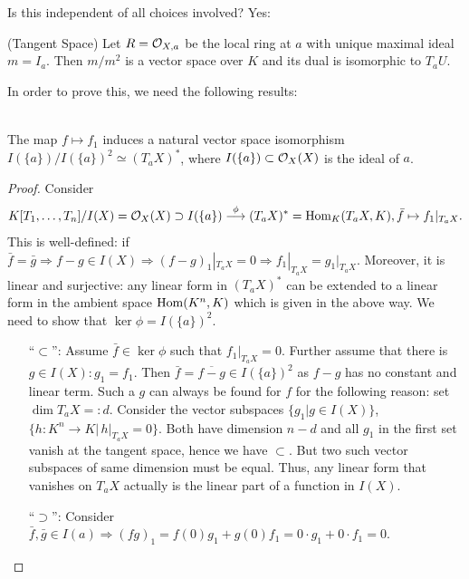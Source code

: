 \documentclass[a4paper,11pt]{article}
\begin{document}
				Is this independent of all choices involved? Yes:
				\\

				\begin{prop}(Tangent Space)\label{prop--tangentspace}
					Let $R=\mathcal{O}_{X,a}$ be the local ring at $a$ with unique maximal ideal $m=I_a$. Then $m/m^2$ is a vector space over $K$ and its dual is isomorphic to $T_aU$.
				\end{prop}

				In order to prove this, we need the following results:

				\begin{thm}\phantom{k}\\
					The map $f\mapsto f_1$ induces a natural vector space isomorphism $I(\{a\})/I(\{a\})^2\simeq(T_aX)^\ast$, where $I(\{a\})\subset\mathcal{O}_X(X)$ is the ideal of $a$.
				\end{thm}
				\begin{proof}
					Consider 
					\begin{equation*}
						K[T_1,\dots,T_{n}]/I(X)=\mathcal{O}_X(X)\supset I(\{a\})\overset{\phi}{\longrightarrow} (T_aX)^\ast=\operatorname{Hom}_K(T_aX,K), \bar{f}\mapsto f_1|_{T_aX}.
					\end{equation*}
					This is well-defined: if $\bar{f}=\bar{g}\Longrightarrow f-g\in I(X)\Longrightarrow (f-g)_1|_{T_aX}=0\Longrightarrow f_1|_{T_aX}=g_1|_{T_aX}$. Moreover, it is linear and surjective: any linear form in $(T_aX)^\ast$ can be extended to a linear form in the ambient space $\operatorname{Hom}(K^n,K)$ which is given in the above way. We need to show that $\ker\phi=I(\{a\})^2$.
					\begin{enumerate}
						\item[``$\subset$'':] Assume $\bar{f}\in\ker\phi$ such that $f_1|_{T_aX}=0$. Further assume that there is $g\in I(X): g_1=f_1$. Then $\bar{f}=\overline{f-g}\in I(\{a\})^2$ as $f-g$ has no constant and linear term. Such a $g$ can always be found for $f$ for the following reason: set $\dim T_aX=:d$. Consider the vector subspaces $\{g_1|g\in I(X)\}$, $\{h:K^n\rightarrow K|\,h|_{T_aX}=0\}$. Both have dimension $n-d$ and all $g_1$ in the first set vanish at the tangent space, hence we have $\subset$. But two such vector subspaces of same dimension must be equal. Thus, any linear form that vanishes on $T_aX$ actually is the linear part of a function in $I(X)$. 
						\item[``$\supset$'':] Consider $\bar{f},\bar{g}\in I(a)\Longrightarrow (fg)_1=f(0)g_1+g(0)f_1=0\cdot g_1+0\cdot f_1=0$.
					\end{enumerate}
				\end{proof}
\end{document}
